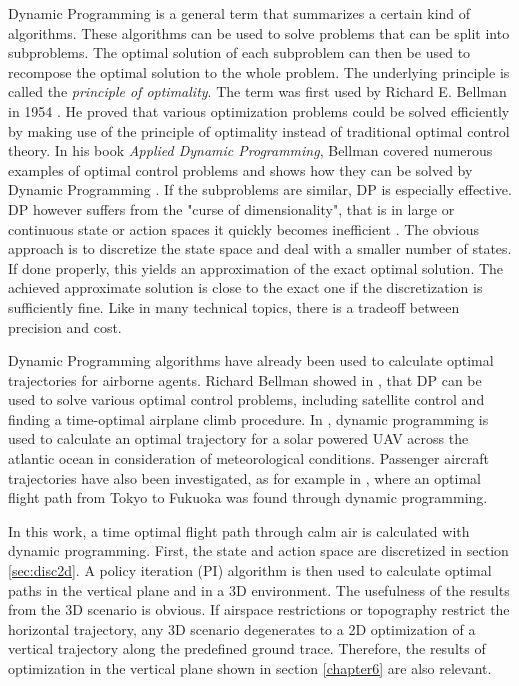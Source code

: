 Dynamic Programming is a general term that summarizes a certain kind of algorithms. These algorithms can be used to solve problems that can be split into subproblems. The optimal solution of each subproblem can then be used to recompose the optimal solution to the whole problem. The underlying principle is called the \textit{principle of optimality}. The term was first used by Richard E. Bellman in 1954 \cite{Bellman1954}. He proved that various optimization problems could be solved efficiently by making use of the principle of optimality instead of traditional optimal control theory. In his book \textit{Applied Dynamic Programming}, Bellman covered numerous examples of optimal control problems and shows how they can be solved by Dynamic Programming \cite{Bellman1962}. 
If the subproblems are similar, DP is especially effective. DP however suffers from the "curse of dimensionality", that is in large or continuous state or action spaces it quickly becomes inefficient \cite{Powell2007ADP}. The obvious approach is to discretize the state space and deal with a smaller number of states. If done properly, this yields an approximation of the exact optimal solution. The achieved approximate solution is close to the exact one if the discretization is sufficiently fine. Like in many technical topics, there is a tradeoff between precision and cost.

Dynamic Programming algorithms have already been used to calculate optimal trajectories for airborne agents. Richard Bellman showed in \cite[chapter~VI]{Bellman1962}, that DP can be used to solve various optimal control problems, including satellite control and finding a time-optimal airplane climb procedure. In \cite{Wirth2015MeteorologicalPP}, dynamic programming is used to calculate an optimal trajectory for a solar powered UAV across the atlantic ocean in consideration of meteorological conditions. Passenger aircraft trajectories have also been investigated, as for example in \cite{HARADA2013441}, where an optimal flight path from Tokyo to Fukuoka was found through dynamic programming.

In this work, a time optimal flight path through calm air is calculated with dynamic programming. First, the state and action space are discretized in section \ref{sec:disc2d}. A policy iteration (PI) algorithm is then used to calculate optimal paths in the vertical plane and in a 3D environment. The usefulness of the results from the 3D scenario is obvious. If airspace restrictions or topography restrict the horizontal trajectory, any 3D scenario degenerates to a 2D optimization of a vertical trajectory along the predefined ground trace. Therefore, the results of optimization in the vertical plane shown in section \ref{chapter6} are also relevant.

